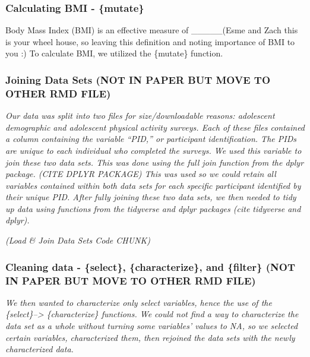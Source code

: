 \documentclass[
]{article}
\begin{document}
\hypertarget{calculating-bmi---mutate}{%
\subsubsection{Calculating BMI -
\{mutate\}}\label{calculating-bmi---mutate}}

Body Mass Index (BMI) is an effective measure of \_\_\_\_\_(Esme and
Zach this is your wheel house, so leaving this definition and noting
importance of BMI to you :) To calculate BMI, we utilized the \{mutate\}
function.

\hypertarget{joining-data-sets-not-in-paper-but-move-to-other-rmd-file}{%
\subsubsection{Joining Data Sets (NOT IN PAPER BUT MOVE TO OTHER RMD
FILE)}\label{joining-data-sets-not-in-paper-but-move-to-other-rmd-file}}

\emph{Our data was split into two files for size/downloadable reasons:
adolescent demographic and adolescent physical activity surveys. Each of
these files contained a column containing the variable ``PID,'' or
participant identification. The PIDs are unique to each individual who
completed the surveys. We used this variable to join these two data
sets. This was done using the full join function from the dplyr package.
(CITE DPLYR PACKAGE) This was used so we could retain all variables
contained within both data sets for each specific participant identified
by their unique PID. After fully joining these two data sets, we then
needed to tidy up data using functions from the tidyverse and dplyr
packages (cite tidyverse and dplyr).}

\emph{(Load \& Join Data Sets Code CHUNK)}

\hypertarget{cleaning-data---select-characterize-and-filter-not-in-paper-but-move-to-other-rmd-file}{%
\subsubsection{Cleaning data - \{select\}, \{characterize\}, and
\{filter\} (NOT IN PAPER BUT MOVE TO OTHER RMD
FILE)}\label{cleaning-data---select-characterize-and-filter-not-in-paper-but-move-to-other-rmd-file}}

\emph{We then wanted to characterize only select variables, hence the
use of the \{select\}--\textgreater{} \{characterize\} functions. We
could not find a way to characterize the data set as a whole without
turning some variables' values to NA, so we selected certain variables,
characterized them, then rejoined the data sets with the newly
characterized data.}
\end{document}
